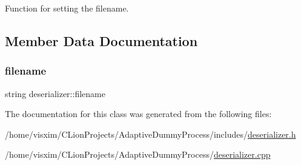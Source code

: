 Function for setting the filename. 



\subsection{Member Data Documentation}
\mbox{\label{classdeserializer_acef129bae806d64a1692d805c3755ce4}} 
\subsubsection{\texorpdfstring{filename}{filename}}
{\footnotesize\ttfamily string deserializer\+::filename\hspace{0.3cm}{\ttfamily [private]}}



The documentation for this class was generated from the following files\+:\begin{DoxyCompactItemize}
\item 
/home/visxim/\+C\+Lion\+Projects/\+Adaptive\+Dummy\+Process/includes/\hyperlink{deserializer_8h}{deserializer.\+h}\item 
/home/visxim/\+C\+Lion\+Projects/\+Adaptive\+Dummy\+Process/\hyperlink{deserializer_8cpp}{deserializer.\+cpp}\end{DoxyCompactItemize}
